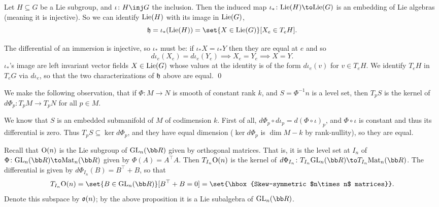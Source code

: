 \bthrm

    Let $H\subseteq G$ be a Lie subgroup, and $\iota\colon H\inj G$ the inclusion.
    Then the induced map $\iota_*\colon\lie(H)\to\lie(G)$ is an embedding of Lie algebras (meaning it is injective).
    So we can identify ${\rm Lie}(H)$ with its image in ${\rm Lie}(G)$,
    $$ \h = \iota_*(\lie(H)) = \set{X\in\lie(G)}[X_e\in T_eH] . $$

\ethrm

\bproof

    The differential of an immersion is injective, so $\iota_*$ must be: if $\iota_*X=\iota_*Y$ then they are equal at $e$ and so
    $$ d\iota_e(X_e) = d\iota_e(Y_e) \implies X_e = Y_e \implies X = Y . $$
    $\iota_*$'s image are left invariant vector fields $X\in{\rm Lie}(G)$ whose values at the identity is of the form $d\iota_e(v)$
    for $v\in T_eH$.
    We identify $T_eH$ in $T_eG$ via $d\iota_e$, so that the two characterizations of ${{\frak h}}$ above are equal.
    \qed

\eproof

\bnote

    We make the following observation, that if $\Phi\colon M\to N$ is smooth of constant rank $k$, and $S=\Phi^{-1}n$ is a level set,
    then $T_pS$ is the kernel of $d\Phi_p\colon T_pM\to T_pN$ for all $p\in M$.

    We know that $S$ is an embedded submanifold of $M$ of codimension $k$.
    First of all, $d\Phi_p\circ d\iota_p=d(\Phi\circ\iota)_p$, and $\Phi\circ\iota$ is constant and thus its differential is zero.
    Thus $T_pS\subseteq\ker d\Phi_p$, and they have equal dimension ($\ker d\Phi_p$ is $\dim M-k$ by rank-nullity), so they are equal.

\enote

\bexam

    Recall that ${\rm O}(n)$ is the Lie subgroup of $\gl_n(\bR)$ given by orthogonal matrices.
    That is, it is the level set at $I_n$ of $\Phi\colon\gl_n(\bR)\to\mat_n(\bR)$ given by $\Phi(A)=A^\top A$.
    Then $T_{I_n}{\rm O}(n)$ is the kernel of $d\Phi_{I_n}\colon T_{I_n}\gl_n(\bR)\to T_{I_n}\mat_n(\bR)$.
    The differential is given by $d\Phi_{I_n}(B)=B^\top+B$, so that
    $$ T_{I_n}\orth(n) = \set{B\in\gl_n(\bR)}[B^\top+B=0] = \set{\hbox{Skew-symmetric $n\times n$ matrices}} . $$
    Denote this subspace by ${{\frak o}}(n)$; by the above proposition it is a Lie subalgebra of $\gl_n(\bR)$.

\eexam

